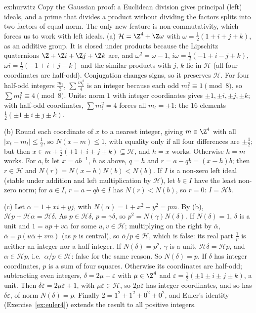 \begin{solution}{ex:hurwitz}
\idea Copy the Gaussian proof: a Euclidean division gives principal (left) ideals, and a prime that divides a product without dividing the factors splits into two factors of equal norm. The only new feature is non-commutativity, which forces us to work with left ideals.
\writeup (a) $\mathcal H=\Z^4+\Z\omega$ with $\omega=\frac12(1+i+j+k)$, as an additive group. It is closed under products because the Lipschitz quaternions $\Z+\Z i+\Z j+\Z k$ are, and $\omega^2=\omega-1$, $i\omega=\frac12(-1+i-j+k)$, $\omega i=\frac12(-1+i+j-k)$ and the similar products with $j$, $k$ lie in $\mathcal H$ (all four coordinates are half-odd). Conjugation changes signs, so it preserves $\mathcal H$. For four half-odd integers $\frac{m_t}2$, $\sum\frac{m_t^2}4$ is an integer because each odd $m_t^2\equiv1\pmod8$, so $\sum m_t^2\equiv4\pmod8$. Units: norm $1$ with integer coordinates gives $\pm1,\pm i,\pm j,\pm k$; with half-odd coordinates, $\sum m_t^2=4$ forces all $m_t=\pm1$: the $16$ elements $\frac12(\pm1\pm i\pm j\pm k)$.

(b) Round each coordinate of $x$ to a nearest integer, giving $m\in\Z^4$ with all $|x_t-m_t|\le\frac12$, so $N(x-m)\le1$, with equality only if all four differences are $\pm\frac12$; but then $x\in m+\frac12(\pm1\pm i\pm j\pm k)\subseteq\mathcal H$, and $h=x$ works. Otherwise $h=m$ works. For $a,b$: let $x=ab^{-1}$, $h$ as above, $q=h$ and $r=a-qb=(x-h)b$; then $r\in\mathcal H$ and $N(r)=N(x-h)N(b)<N(b)$. If $I$ is a non-zero left ideal (stable under addition and left multiplication by $\mathcal H$), let $b\in I$ have the least non-zero norm; for $a\in I$, $r=a-qb\in I$ has $N(r)<N(b)$, so $r=0$: $I=\mathcal Hb$.

(c) Let $\alpha=1+xi+yj$, with $N(\alpha)=1+x^2+y^2=pm$. By (b), $\mathcal Hp+\mathcal H\alpha=\mathcal H\delta$. As $p\in\mathcal H\delta$, $p=\gamma\delta$, so $p^2=N(\gamma)N(\delta)$.
If $N(\delta)=1$, $\delta$ is a unit and $1=up+v\alpha$ for some $u,v\in\mathcal H$; multiplying on the right by $\bar\alpha$, $\bar\alpha=p(u\bar\alpha+vm)$ (as $p$ is central), so $\bar\alpha/p\in\mathcal H$, which is false: its real part $\frac1p$ is neither an integer nor a half-integer.
If $N(\delta)=p^2$, $\gamma$ is a unit, $\mathcal H\delta=\mathcal Hp$, and $\alpha\in\mathcal Hp$, i.e.\ $\alpha/p\in\mathcal H$: false for the same reason.
So $N(\delta)=p$. If $\delta$ has integer coordinates, $p$ is a sum of four squares. Otherwise its coordinates are half-odd; subtracting even integers, $\delta=2\mu+\varepsilon$ with $\mu\in\Z^4$ and $\varepsilon=\frac12(\pm1\pm i\pm j\pm k)$, a unit. Then $\delta\bar\varepsilon=2\mu\bar\varepsilon+1$, with $\mu\bar\varepsilon\in\mathcal H$, so $2\mu\bar\varepsilon$ has integer coordinates, and so has $\delta\bar\varepsilon$, of norm $N(\delta)=p$. Finally $2=1^2+1^2+0^2+0^2$, and Euler's identity (Exercise~\ref{ex:euler4}) extends the result to all positive integers.
\end{solution}

